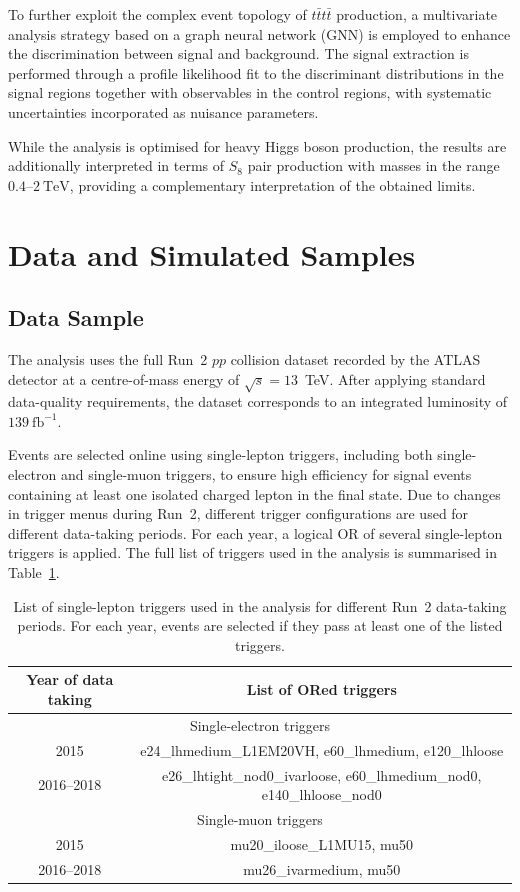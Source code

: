 To further exploit the complex event topology of $t\bar{t}t\bar{t}$ production,
a multivariate analysis strategy based on a graph neural network (GNN)
is employed to enhance the discrimination between signal and
background. The signal extraction is performed through a profile
likelihood fit to the discriminant distributions in the signal
regions together with observables in the control regions, with
systematic uncertainties incorporated as nuisance parameters.

While the analysis is optimised for heavy Higgs boson production,
the results are additionally interpreted in terms of $S_{8}$ pair
production with masses in the range $0.4$--$2~\mathrm{TeV}$,
providing a complementary interpretation of the obtained limits.

\section{Data and Simulated Samples}

\subsection{Data Sample}
\label{subsec:data_sample}

The analysis uses the full Run~2 $pp$ collision dataset recorded by the ATLAS
detector at a centre-of-mass energy of $\sqrt{s}=13$~TeV.
After applying standard data-quality requirements, the dataset corresponds to an
integrated luminosity of $139~\mathrm{fb}^{-1}$.

Events are selected online using single-lepton triggers, including both single-electron
and single-muon triggers, to ensure high efficiency for signal events containing at least
one isolated charged lepton in the final state.
Due to changes in trigger menus during Run~2, different trigger configurations are used
for different data-taking periods.
For each year, a logical OR of several single-lepton triggers is applied.
The full list of triggers used in the analysis is summarised in
Table~\ref{tab:slep_trigger}.

\begin{table}[htbp]
\centering
\caption{List of single-lepton triggers used in the analysis for different Run~2
data-taking periods.
For each year, events are selected if they pass at least one of the listed triggers.}
\label{tab:slep_trigger}
\begin{tabular}{c|c}
\hline
Year of data taking & List of ORed triggers \\
\hline\hline
\multicolumn{2}{c}{Single-electron triggers} \\
\hline\hline
2015 & e24\_lhmedium\_L1EM20VH, e60\_lhmedium, e120\_lhloose \\
2016--2018 & e26\_lhtight\_nod0\_ivarloose, e60\_lhmedium\_nod0, e140\_lhloose\_nod0 \\
\hline\hline
\multicolumn{2}{c}{Single-muon triggers} \\
\hline\hline
2015 & mu20\_iloose\_L1MU15, mu50 \\
2016--2018 & mu26\_ivarmedium, mu50 \\
\hline
\end{tabular}
\end{table}

